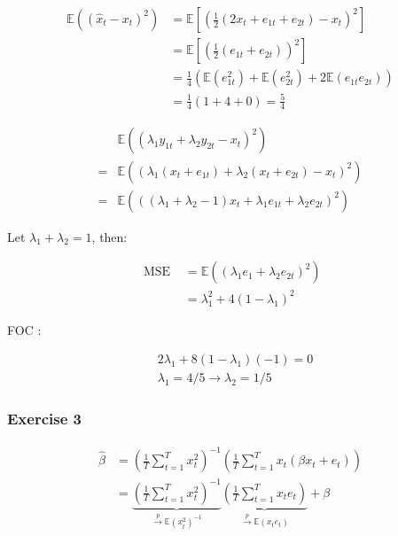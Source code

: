 {{\begin{enumerate}[label=(\alph*)]
{\item 
$$
\begin{aligned}
\mathbb{E}\left(\left(\hat{x}_{t}-x_{t}\right)^{2}\right) & =\mathbb{E}\left[\left(\frac{1}{2}\left(2 x_{t}+e_{1 t}+e_{2 t}\right)-x_{t}\right)^{2}\right] \\
& =\mathbb{E}\left[\left(\frac{1}{2}\left(e_{1t}+e_{2 t}\right)\right)^{2}\right] \\
& =\frac{1}{4}\left(\mathbb{E}\left(e_{1 t}^{2}\right)+\mathbb{E}\left(e_{2 t}^{2}\right)+2 \mathbb{E}\left(e_{1 t} e_{2 t}\right)\right) \\
& =\frac{1}{4}(1+4+0)=\frac{5}{4}
\end{aligned}
$$
}
{\item 
$$
\begin{aligned}
& \mathbb{E}\left(\left(\lambda_{1} y_{1 t}+\lambda_{2} y_{2 t}-x_{t}\right)^{2}\right) \\
= & \mathbb{E}\left(\left(\lambda_{1}\left(x_{t}+e_{1 t}\right)+\lambda_{2}\left(x_{t}+e_{2 t}\right)-x_{t}\right)^{2}\right) \\
= & \mathbb{E}\left(\left(\left(\lambda_{1}+\lambda_{2}-1\right) x_{t}+\lambda_{1} e_{1 t}+\lambda_{2} e_{2 t}\right)^{2}\right)
\end{aligned}
$$

Let $\lambda_{1}+\lambda_{2}=1$, then:

$$
\begin{aligned}
\text { MSE } & =\mathbb{E}\left(\left(\lambda_{1} e_{1}+\lambda_{2} e_{2 t}\right)^{2}\right) \\
& =\lambda_{1}^{2}+4\left(1-\lambda_{1}\right)^{2}
\end{aligned}
$$

FOC :

$$
\begin{aligned}
& 2 \lambda_{1}+8\left(1-\lambda_{1}\right)(-1)=0 \\
& \lambda_{1}=4 / 5 \longrightarrow \lambda_{2}=1 / 5
\end{aligned}
$$
}
\end{enumerate}
}
{
\subsubsection*{Exercise 3}

\begin{enumerate}[label=(\alph*)]
{\item 
$$
\begin{aligned}
\hat{\beta} & =\left(\frac{1}{T} \sum_{t=1}^{T} x_{t}^{2}\right)^{-1}\left(\frac{1}{T} \sum_{t=1}^{T} x_{t}\left(\beta x_{t}+e_{t}\right)\right) \\
& =\underbrace{\left(\frac{1}{T} \sum_{t=1}^{T} x_{t}^{2}\right)^{-1}}_{\xrightarrow{p} \mathbb{E}\left(x_{t}^{2}\right)^{-1}} \underbrace{\left(\frac{1}{T} \sum_{t=1}^{T} x_{t} e_{t}\right)}_{\xrightarrow{p} \mathbb{E}\left(x_{t} e_{t}\right)}+\beta
\end{aligned}
$$

}
\end{enumerate}}}
